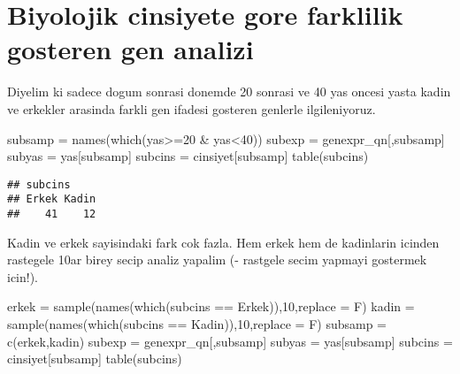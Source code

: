 \documentclass[
]{book}
\newenvironment{Shaded}{\begin{snugshade}}{\end{snugshade}}
\newcommand{\AttributeTok}[1]{\textcolor[rgb]{0.77,0.63,0.00}{#1}}
\newcommand{\DecValTok}[1]{\textcolor[rgb]{0.00,0.00,0.81}{#1}}
\newcommand{\FunctionTok}[1]{\textcolor[rgb]{0.00,0.00,0.00}{#1}}
\newcommand{\NormalTok}[1]{#1}
\newcommand{\OtherTok}[1]{\textcolor[rgb]{0.56,0.35,0.01}{#1}}
\newcommand{\SpecialCharTok}[1]{\textcolor[rgb]{0.00,0.00,0.00}{#1}}
\newcommand{\StringTok}[1]{\textcolor[rgb]{0.31,0.60,0.02}{#1}}
\begin{document}
\hypertarget{biyolojik-cinsiyete-gore-farklilik-gosteren-gen-analizi}{%
\chapter{Biyolojik cinsiyete gore farklilik gosteren gen analizi}\label{biyolojik-cinsiyete-gore-farklilik-gosteren-gen-analizi}}

Diyelim ki sadece dogum sonrasi donemde 20 sonrasi ve 40 yas oncesi yasta kadin ve erkekler arasinda farkli gen ifadesi gosteren genlerle ilgileniyoruz.

\begin{Shaded}
\begin{Highlighting}[]
\NormalTok{subsamp }\OtherTok{=} \FunctionTok{names}\NormalTok{(}\FunctionTok{which}\NormalTok{(yas}\SpecialCharTok{\textgreater{}=}\DecValTok{20} \SpecialCharTok{\&}\NormalTok{ yas}\SpecialCharTok{\textless{}}\DecValTok{40}\NormalTok{))}
\NormalTok{subexp }\OtherTok{=}\NormalTok{ genexpr\_qn[,subsamp]}
\NormalTok{subyas }\OtherTok{=}\NormalTok{ yas[subsamp]}
\NormalTok{subcins }\OtherTok{=}\NormalTok{ cinsiyet[subsamp]}
\FunctionTok{table}\NormalTok{(subcins)}
\end{Highlighting}
\end{Shaded}

\begin{verbatim}
## subcins
## Erkek Kadin 
##    41    12
\end{verbatim}

Kadin ve erkek sayisindaki fark cok fazla. Hem erkek hem de kadinlarin icinden rastegele 10ar birey secip analiz yapalim (- rastgele secim yapmayi gostermek icin!).

\begin{Shaded}
\begin{Highlighting}[]
\NormalTok{erkek }\OtherTok{=} \FunctionTok{sample}\NormalTok{(}\FunctionTok{names}\NormalTok{(}\FunctionTok{which}\NormalTok{(subcins }\SpecialCharTok{==} \StringTok{\textquotesingle{}Erkek\textquotesingle{}}\NormalTok{)),}\DecValTok{10}\NormalTok{,}\AttributeTok{replace =}\NormalTok{ F)}
\NormalTok{kadin }\OtherTok{=} \FunctionTok{sample}\NormalTok{(}\FunctionTok{names}\NormalTok{(}\FunctionTok{which}\NormalTok{(subcins }\SpecialCharTok{==} \StringTok{\textquotesingle{}Kadin\textquotesingle{}}\NormalTok{)),}\DecValTok{10}\NormalTok{,}\AttributeTok{replace =}\NormalTok{ F)}
\NormalTok{subsamp }\OtherTok{=} \FunctionTok{c}\NormalTok{(erkek,kadin)}
\NormalTok{subexp }\OtherTok{=}\NormalTok{ genexpr\_qn[,subsamp]}
\NormalTok{subyas }\OtherTok{=}\NormalTok{ yas[subsamp]}
\NormalTok{subcins }\OtherTok{=}\NormalTok{ cinsiyet[subsamp]}
\FunctionTok{table}\NormalTok{(subcins)}
\end{Highlighting}
\end{Shaded}
\end{document}
